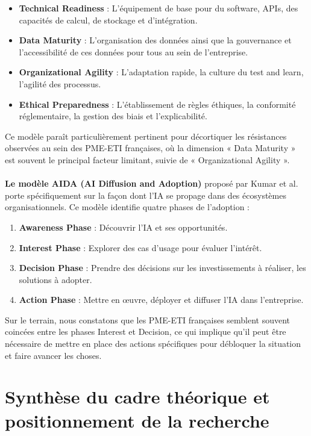 \begin{itemize}
    \item \textbf{Technical Readiness} : L’équipement de base pour du software, APIs, des capacités de calcul, de stockage et d’intégration.
    \item \textbf{Data Maturity} : L’organisation des données ainsi que la gouvernance et l’accessibilité de ces données pour tous au sein de l’entreprise.
    \item \textbf{Organizational Agility} : L’adaptation rapide, la culture du test and learn, l’agilité des processus.
    \item \textbf{Ethical Preparedness} : L’établissement de règles éthiques, la conformité réglementaire, la gestion des biais et l’explicabilité.
\end{itemize}
\medskip
Ce modèle paraît particulièrement pertinent pour décortiquer les résistances observées au sein des PME-ETI françaises, où la dimension « Data Maturity » est souvent le principal facteur limitant, suivie de « Organizational Agility ».
\\\\
\textbf{Le modèle AIDA (AI Diffusion and Adoption)} proposé par Kumar et al. porte spécifiquement sur la façon dont l’IA se propage dans des écosystèmes organisationnels. Ce modèle identifie quatre phases de l’adoption :

\begin{enumerate}
    \item \textbf{Awareness Phase} : Découvrir l’IA et ses opportunités.
    \item \textbf{Interest Phase} : Explorer des cas d’usage pour évaluer l’intérêt.
    \item \textbf{Decision Phase} : Prendre des décisions sur les investissements à réaliser, les solutions à adopter.
    \item \textbf{Action Phase} : Mettre en œuvre, déployer et diffuser l’IA dans l’entreprise.
\end{enumerate}

Sur le terrain, nous constatons que les PME-ETI françaises semblent souvent coincées entre les phases Interest et Decision, ce qui implique qu’il peut être nécessaire de mettre en place des actions spécifiques pour débloquer la situation et faire avancer les choses.

\section{Synthèse du cadre théorique et positionnement de la recherche}

